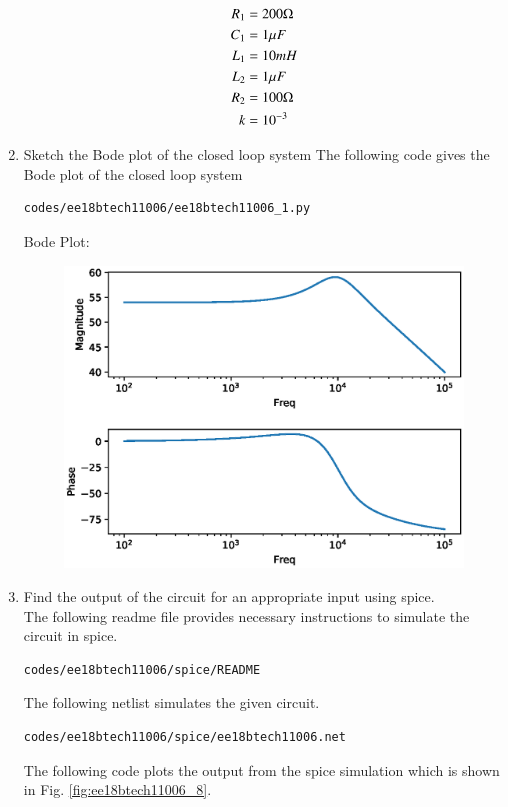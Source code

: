\begin{enumerate}[label=\arabic*.,ref=\theenumi]
\begin{figure}[!ht]
\end{figure}
\begin{align}
R_1&= 200\ohm \\
C_1&= 1\mu F\\
L_1&= 10mH \\
L_2&=1\mu F\\
R_2&=100\ohm\\
k&=10^{-3}
\end{align}
\item Sketch the Bode plot of the closed loop system
\solution The following code gives the Bode plot of the closed loop system
\begin{lstlisting}
codes/ee18btech11006/ee18btech11006_1.py
\end{lstlisting}
Bode Plot:
\begin{figure}[ht!]
\centering
\includegraphics[width=\columnwidth]{./figs/ee18btech11006/ee18btech11006_7.eps}
\caption{}
\label{fig:ee18btech11006_7}
\end{figure}
\item Find the output of the circuit for an appropriate input using spice.\\
\solution
The following readme file provides necessary instructions to simulate the circuit in spice.
\begin{lstlisting}
codes/ee18btech11006/spice/README
\end{lstlisting}
The following netlist simulates the given circuit.
\begin{lstlisting}
codes/ee18btech11006/spice/ee18btech11006.net
\end{lstlisting}
The following code plots the output from the spice simulation which is shown in Fig. \ref{fig:ee18btech11006_8}.

\end{enumerate}
